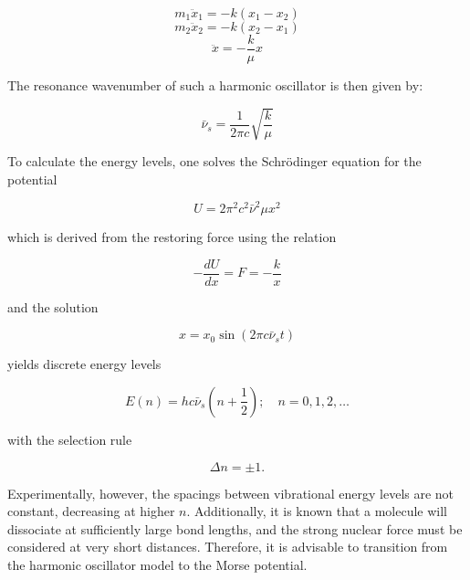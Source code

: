 \documentclass{article}
\begin{document}
\begin{equation*}
m_1 \ddot{x}_1 = -k(x_1 - x_2) 
\end{equation*}
\begin{equation*}
m_2 \ddot{x}_2 = -k(x_2 - x_1) 
\end{equation*}
\begin{equation*}
\ddot{x} = -\frac{k}{\mu}x 
\end{equation*}

The resonance wavenumber of such a harmonic oscillator is then given by:

\begin{equation*}
\bar{\nu}_s = \frac{1}{2\pi c}\sqrt{\frac{k}{\mu}} 
\end{equation*}

To calculate the energy levels, one solves the Schrödinger equation for the potential

\begin{equation*}
U = 2\pi^2c^2\bar{\nu}^2\mu x^2
\end{equation*}

which is derived from the restoring force using the relation

\begin{equation*}
-\frac{dU}{dx} = F = -\frac{k}{x} 
\end{equation*}

and the solution

\begin{equation*}
x = x_0 \sin(2\pi c\bar{\nu}_s t) 
\end{equation*}

yields discrete energy levels

\begin{equation*}
E(n) = h c \bar{\nu}_s \left(n + \frac{1}{2}\right); \quad n = 0, 1, 2, \ldots
\end{equation*}

with the selection rule

\begin{equation*}
\Delta n = \pm 1. 
\end{equation*}

Experimentally, however, the spacings between vibrational energy levels are not constant, decreasing at higher $n$. Additionally, it is known that a molecule will dissociate at sufficiently large bond lengths, and the strong nuclear force must be considered at very short distances. Therefore, it is advisable to transition from the harmonic oscillator model to the Morse potential.
\end{document}
